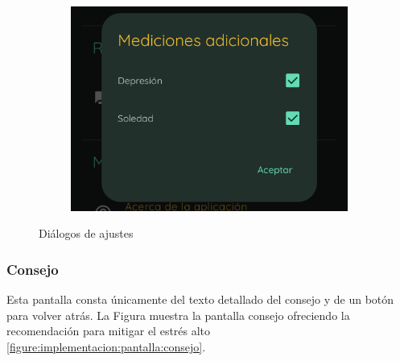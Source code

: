 \begin{figure}[htbp]
\begin{subfigure}[c]{0.29\textwidth}
                	\end{subfigure}
                    \hspace{0.05\textwidth}
                	\begin{subfigure}[c]{0.29\textwidth}
                		\centering
                		\includegraphics[width=1\linewidth]{figures/pantallas/Ajuste mediciones.png}
                	\end{subfigure}
                	\caption{Diálogos de ajustes}
                	\label{figure:implementacion:pantalla:dialogos_ajustes}
                \end{figure}
                
                \clearpage  %
            \subsubsection*{Consejo}

                Esta pantalla consta únicamente del texto detallado del consejo y de un botón para volver atrás. La Figura muestra la pantalla consejo ofreciendo la recomendación para mitigar el estrés alto \ref{figure:implementacion:pantalla:consejo}.
                
